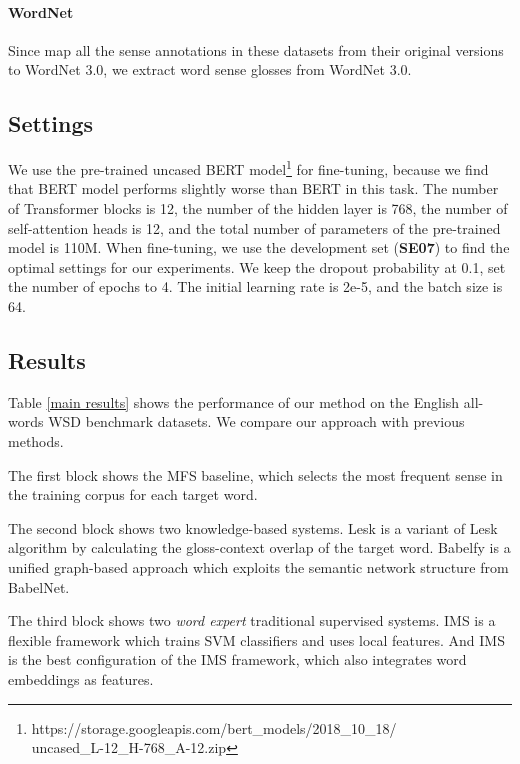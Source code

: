\documentclass[11pt,a4paper]{article}
\begin{document}
\paragraph{WordNet}
Since \citet{raganato2017word} map all the sense annotations in these datasets from their original versions to WordNet 3.0, we extract word sense glosses from WordNet 3.0.


\subsection{Settings}
We use the pre-trained uncased BERT model\footnote{https://storage.googleapis.com/bert\_models/2018\_10\_18/\\uncased\_L-12\_H-768\_A-12.zip} for fine-tuning, because we find that BERT model performs slightly worse than BERT in this task. The number of Transformer blocks is 12, the number of the hidden layer is 768, the number of self-attention heads is 12, and the total number of parameters of the pre-trained model is 110M. When fine-tuning, we use the development set (\textbf{SE07}) to find the optimal settings for our experiments. We keep the dropout probability at 0.1, set the number of epochs to 4. The initial learning rate is 2e-5, and the batch size is 64.















\subsection{Results}

Table \ref{main results} shows the performance of our method on the English all-words WSD benchmark datasets. We compare our approach with previous methods.


The first block shows the MFS baseline, which selects the most frequent sense in the training corpus for each target word.

The second block shows two knowledge-based systems. Lesk \citep{basile2014enhanced} is a variant of Lesk algorithm \citep{lesk1986automatic} by calculating the gloss-context overlap of the target word. Babelfy \citep{moro2014entity} is a unified graph-based approach which exploits the semantic network structure from BabelNet.


The third block shows two \textit{word expert} traditional supervised systems. IMS \citep{zhong2010makes} is a flexible framework which trains SVM classifiers and uses local features. And IMS \citep{iacobacci2016embeddings} is the best configuration of the IMS framework, which also integrates word embeddings as features.
\end{document}
